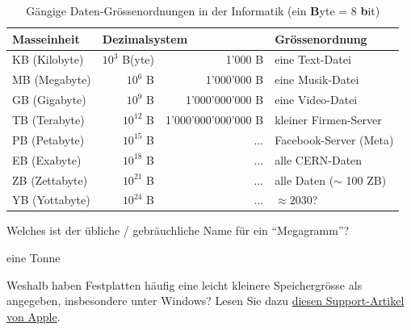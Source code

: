 \begin{table}[H]
	\centering
	\begin{tabular}{@{}l|rr|l@{}}
		\toprule
		\textbf{Masseinheit} & \multicolumn{2}{l|}{\textbf{Dezimalsystem}} & Grössenordnung                                   \\ \midrule
		KB (Kilobyte)        & $10^3$ B(yte)                               & 1'000 B             & eine Text-Datei            \\
		MB (Megabyte)        & $10^6$ B                                    & 1'000'000 B         & eine Musik-Datei           \\
		GB (Gigabyte)        & $10^9$ B                                    & 1'000'000'000 B     & eine Video-Datei           \\
		TB (Terabyte)        & $10^{12}$ B                                 & 1'000'000'000'000 B & kleiner Firmen-Server      \\
		PB (Petabyte)        & $10^{15}$ B                                 & ...                 & Facebook-Server (Meta)     \\
		EB (Exabyte)         & $10^{18}$ B                                 & ...                 & alle CERN-Daten            \\
		ZB (Zettabyte)       & $10^{21}$ B                                 & ...                 & alle Daten ($\sim$ 100 ZB) \\
		YB (Yottabyte)       & $10^{24}$ B                                 & ...                 & $\approx 2030$?            \\ \bottomrule
	\end{tabular}
	\caption{Gängige Daten-Grössenordnungen in der Informatik (ein \textbf{B}yte = 8 \textbf{b}it)}
	\label{table:daten-groessenordnungen}
\end{table}

\begin{myexercise}
	Welches ist der übliche / gebräuchliche Name für ein \enquote{Megagramm}?
	\begin{myanswer}
		eine Tonne
	\end{myanswer}
\end{myexercise}

\begin{mychallenge}
	Weshalb haben Festplatten häufig eine leicht kleinere Speichergrösse als angegeben, insbesondere unter Windows? Lesen Sie dazu \href{https://support.apple.com/en-us/102119}{diesen Support-Artikel von Apple}.
\end{mychallenge}
